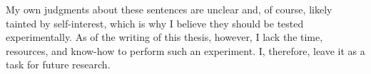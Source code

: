 My own judgments about these sentences are unclear and, of course, likely tainted by self-interest, which is why I believe they should be tested experimentally.
As of the writing of this thesis, however, I lack the time, resources, and know-how to perform such an experiment.
I, therefore, leave it as a task for future research.
